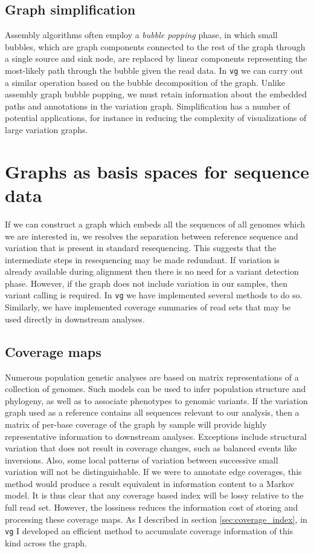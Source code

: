 \subsection{Graph simplification}

Assembly algorithms often employ a \emph{bubble popping} phase, in which small bubbles, which are graph components connected to the rest of the graph through a single source and sink node, are replaced by linear components representing the most-likely path through the bubble given the read data.
In {\tt vg} we can carry out a similar operation based on the bubble decomposition of the graph.
Unlike assembly graph bubble popping, we must retain information about the embedded paths and annotations in the variation graph.
Simplification has a number of potential applications, for instance in reducing the complexity of visualizations of large variation graphs.

\section{Graphs as basis spaces for sequence data}
\label{sec:basis_space}

If we can construct a graph which embeds all the sequences of all genomes which we are interested in, we resolves the separation between reference sequence and variation that is present in standard resequencing.
This suggests that the intermediate steps in resequencing may be made redundant.
If variation is already available during alignment then there is no need for a variant detection phase.
However, if the graph does not include variation in our samples, then variant calling is required.
In {\tt vg} we have implemented several methods to do so.
Similarly, we have implemented coverage summaries of read sets that may be used directly in downstream analyses.

\subsection{Coverage maps}

Numerous population genetic analyses are based on matrix representations of a collection of genomes.
Such models can be used to infer population structure and phylogeny, as well as to associate phenotypes to genomic variants.
If the variation graph used as a reference contains all sequences relevant to our analysis, then a matrix of per-base coverage of the graph by sample will provide highly representative information to downstream analyses.
Exceptions include structural variation that does not result in coverage changes, such as balanced events like inversions.
Also, some local patterns of variation between successive small variation will not be distinguishable.
If we were to annotate edge coverages, this method would produce a result equivalent in information content to a Markov model.
It is thus clear that any coverage based index will be lossy relative to the full read set.
However, the lossiness reduces the information cost of storing and processing these coverage maps.
As I described in section \ref{sec:coverage_index}, in {\tt vg} I developed an efficient method to accumulate coverage information of this kind across the graph.

